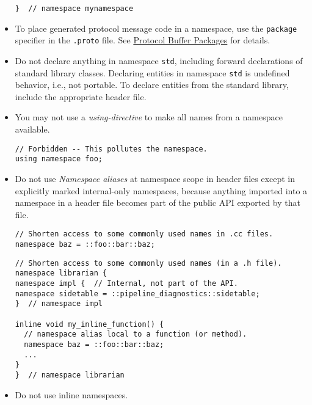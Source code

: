 \begin{itemize}
\begin{verbatim}
}  // namespace mynamespace
    \end{verbatim}
    \item To place generated protocol message code in a namespace, use the \texttt{package} specifier in the \texttt{.proto} file. See \href{https://developers.google.com/protocol-buffers/docs/reference/cpp-generated#package}{Protocol Buffer Packages} for details.
    \item Do not declare anything in namespace \texttt{std}, including forward declarations of standard library classes. Declaring entities in namespace \texttt{std} is undefined behavior, i.e., not portable. To declare entities from the standard library, include the appropriate header file.
    \item You may not use a \emph{using-directive} to make all names from a namespace available.
    \begin{verbatim}
// Forbidden -- This pollutes the namespace.
using namespace foo;
    \end{verbatim}
    \item Do not use \emph{Namespace aliases} at namespace scope in header files except in explicitly marked internal-only namespaces, because anything imported into a namespace in a header file becomes part of the public API exported by that file.
    \begin{verbatim}
// Shorten access to some commonly used names in .cc files.
namespace baz = ::foo::bar::baz;
    \end{verbatim}
    \begin{verbatim}
// Shorten access to some commonly used names (in a .h file).
namespace librarian {
namespace impl {  // Internal, not part of the API.
namespace sidetable = ::pipeline_diagnostics::sidetable;
}  // namespace impl

inline void my_inline_function() {
  // namespace alias local to a function (or method).
  namespace baz = ::foo::bar::baz;
  ...
}
}  // namespace librarian
    \end{verbatim}
    \item Do not use inline namespaces.
\end{itemize}